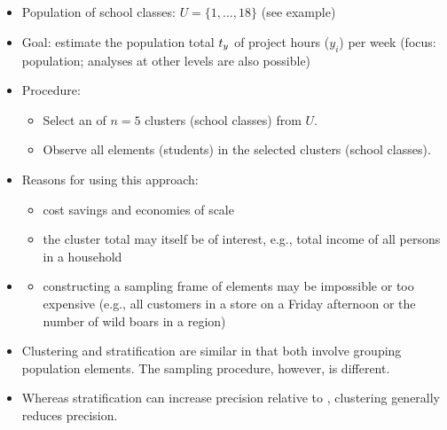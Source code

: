 \documentclass{my_eth_beamer}
\numberwithin{equation}{section}
\begin{document}
\begin{frame}
    \frametitle{\insertsectionnumber~\insertsection}
    \begin{itemize}
    \setlength{\itemsep}{6pt}
        \item \alert{Population} of school classes: $U=\{1,\ldots,18\}$
            (see example)
        \item \alert{Goal}: estimate the population total $t_y$ of
            \alert{project hours} ($y_i$) per week (focus: population;
            analyses at other levels are also possible)
        \item \alert{Procedure}:
            \vspace{0.25em}
            \begin{itemize}
            \setlength{\itemsep}{4pt}
                \item Select an \SRS of $n=5$ \alert{clusters} (school classes)
                    from $U$.
                \item Observe \alert{all elements} (students) in the selected
                    clusters (school classes).
            \end{itemize}
        \item \alert{Reasons} for using this approach:
            \vspace{0.25em}
            \begin{itemize}
            \setlength{\itemsep}{4pt}
                \item cost savings and economies of scale
                \item the cluster total may itself be of interest, e.g.,
                    total income of all persons in a household
            \end{itemize}
    \end{itemize}
\end{frame}

\begin{frame}
    \begin{itemize}
    \setlength{\itemsep}{10pt}
    \item[]
        \begin{itemize}
        \setlength{\itemsep}{2pt}
            \item constructing a sampling frame of elements may be impossible
                or too expensive (e.g., all customers in a store on a Friday
                afternoon or the number of wild boars in a region)
        \end{itemize}
        \item \alert{Clustering} and \alert{stratification} are similar in that
            both involve \alert{grouping} population elements. The sampling
            procedure, however, is different.
        \item Whereas stratification can \alert{increase precision} relative
            to \SRS, clustering generally \alert{reduces precision}.
    \end{itemize}
\end{frame}
\end{document}
